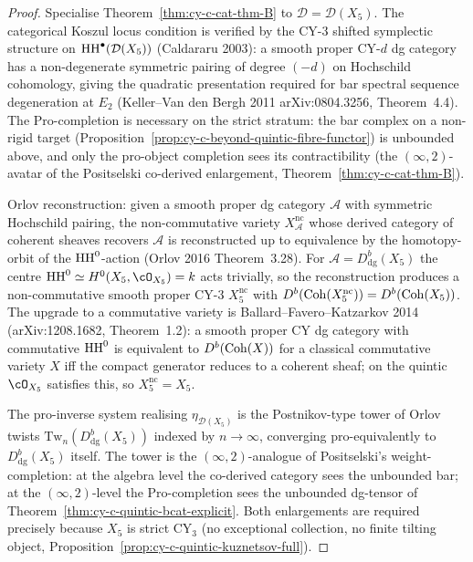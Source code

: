 \begin{proof}
Specialise Theorem~\ref{thm:cy-c-cat-thm-B} to
$\mathcal D = \mathcal D(X_5)$. The categorical Koszul locus condition
is verified by the CY-$3$ shifted symplectic structure on
$\mathrm{HH}^\bullet(\mathcal D(X_5))$ (Caldararu 2003): a smooth proper CY-$d$
dg category has a non-degenerate symmetric pairing of degree $(-d)$ on
Hochschild cohomology, giving the quadratic presentation required for
bar spectral sequence degeneration at $E_2$ (Keller--Van den Bergh 2011
arXiv:0804.3256, Theorem~4.4). The Pro-completion is necessary on the
strict stratum: the bar complex on a non-rigid target
(Proposition~\ref{prop:cy-c-beyond-quintic-fibre-functor}) is unbounded
above, and only the pro-object completion sees its contractibility
(the $(\infty,2)$-avatar of the Positselski co-derived enlargement,
Theorem~\ref{thm:cy-c-cat-thm-B}).

Orlov reconstruction: given a smooth proper dg category $\mathcal A$
with symmetric Hochschild pairing, the non-commutative variety
$X^{\mathrm{nc}}_{\mathcal A}$ whose derived category of coherent
sheaves recovers $\mathcal A$ is reconstructed up to equivalence by
the homotopy-orbit of the $\mathrm{HH}^0$-action (Orlov 2016 Theorem~3.28).
For $\mathcal A = D^b_{\mathrm{dg}}(X_5)$ the centre
$\HH^0 \simeq H^0(X_5, \cO_{X_5}) = k$ acts trivially, so the
reconstruction produces a non-commutative smooth proper CY-$3$
$X_5^{\mathrm{nc}}$ with
$D^b(\mathrm{Coh}(X_5^{\mathrm{nc}})) = D^b(\mathrm{Coh}(X_5))$. The upgrade to a
commutative variety is Ballard--Favero--Katzarkov 2014
(arXiv:1208.1682, Theorem~1.2): a smooth proper CY dg category with
commutative $\mathrm{HH}^0$ is equivalent to $D^b(\mathrm{Coh}(X))$ for a classical
commutative variety $X$ iff the compact generator reduces to a
coherent sheaf; on the quintic $\cO_{X_5}$ satisfies this, so
$X_5^{\mathrm{nc}} = X_5$.

The pro-inverse system realising $\eta_{\mathcal D(X_5)}$ is the
Postnikov-type tower of Orlov twists
$\mathrm{Tw}_n(D^b_{\mathrm{dg}}(X_5))$ indexed by $n \to \infty$,
converging pro-equivalently to $D^b_{\mathrm{dg}}(X_5)$ itself. The
tower is the $(\infty,2)$-analogue of Positselski's weight-completion:
at the algebra level the co-derived category sees the unbounded bar;
at the $(\infty,2)$-level the Pro-completion sees the unbounded
dg-tensor of Theorem~\ref{thm:cy-c-quintic-bcat-explicit}. Both
enlargements are required precisely because $X_5$ is strict CY$_3$
(no exceptional collection, no finite tilting object,
Proposition~\ref{prop:cy-c-quintic-kuznetsov-full}).
\end{proof}

